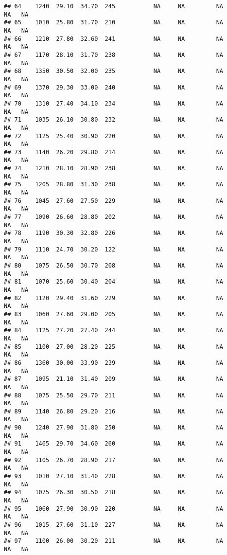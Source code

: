 \documentclass[
]{article}
\begin{document}
\begin{verbatim}
## 64    1240  29.10  34.70  245           NA     NA         NA      NA   NA
## 65    1010  25.80  31.70  210           NA     NA         NA      NA   NA
## 66    1210  27.80  32.60  241           NA     NA         NA      NA   NA
## 67    1170  28.10  31.70  238           NA     NA         NA      NA   NA
## 68    1350  30.50  32.00  235           NA     NA         NA      NA   NA
## 69    1370  29.30  33.00  240           NA     NA         NA      NA   NA
## 70    1310  27.40  34.10  234           NA     NA         NA      NA   NA
## 71    1035  26.10  30.80  232           NA     NA         NA      NA   NA
## 72    1125  25.40  30.90  220           NA     NA         NA      NA   NA
## 73    1140  26.20  29.80  214           NA     NA         NA      NA   NA
## 74    1210  28.10  28.90  238           NA     NA         NA      NA   NA
## 75    1205  28.80  31.30  238           NA     NA         NA      NA   NA
## 76    1045  27.60  27.50  229           NA     NA         NA      NA   NA
## 77    1090  26.60  28.80  202           NA     NA         NA      NA   NA
## 78    1190  30.30  32.80  226           NA     NA         NA      NA   NA
## 79    1110  24.70  30.20  122           NA     NA         NA      NA   NA
## 80    1075  26.50  30.70  208           NA     NA         NA      NA   NA
## 81    1070  25.60  30.40  204           NA     NA         NA      NA   NA
## 82    1120  29.40  31.60  229           NA     NA         NA      NA   NA
## 83    1060  27.60  29.00  205           NA     NA         NA      NA   NA
## 84    1125  27.20  27.40  244           NA     NA         NA      NA   NA
## 85    1100  27.00  28.20  225           NA     NA         NA      NA   NA
## 86    1360  30.00  33.90  239           NA     NA         NA      NA   NA
## 87    1095  21.10  31.40  209           NA     NA         NA      NA   NA
## 88    1075  25.50  29.70  211           NA     NA         NA      NA   NA
## 89    1140  26.80  29.20  216           NA     NA         NA      NA   NA
## 90    1240  27.90  31.80  250           NA     NA         NA      NA   NA
## 91    1465  29.70  34.60  260           NA     NA         NA      NA   NA
## 92    1105  26.70  28.90  217           NA     NA         NA      NA   NA
## 93    1010  27.10  31.40  228           NA     NA         NA      NA   NA
## 94    1075  26.30  30.50  218           NA     NA         NA      NA   NA
## 95    1060  27.90  30.90  220           NA     NA         NA      NA   NA
## 96    1015  27.60  31.10  227           NA     NA         NA      NA   NA
## 97    1100  26.00  30.20  211           NA     NA         NA      NA   NA

\end{verbatim}
\end{document}
